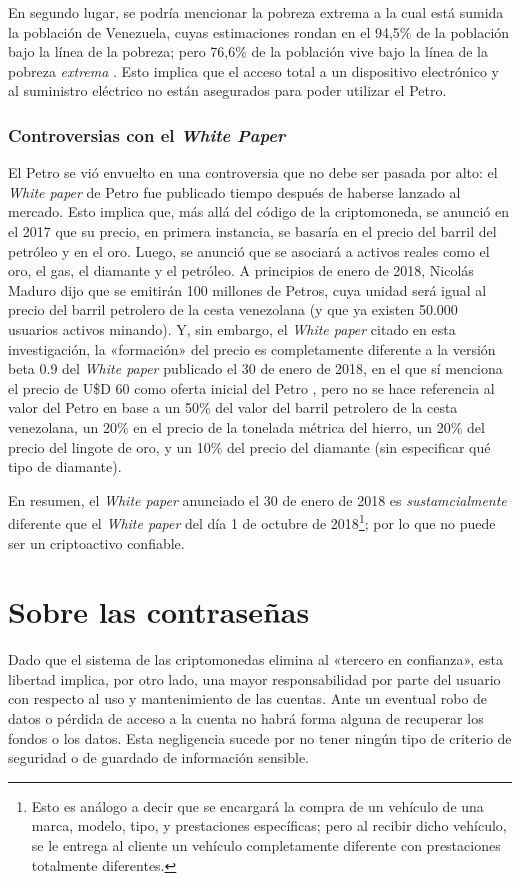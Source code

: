 \documentclass[12pt,a4paper,twoside]{book}
\begin{document}
En segundo lugar, se podría mencionar la pobreza extrema a la cual está sumida la población de Venezuela, cuyas estimaciones rondan en el 94,5\% de la población bajo la línea de la pobreza; pero 76,6\% de la población vive bajo la línea de la pobreza \textit{extrema} \cite[pág. 48]{encovi2021}. Esto implica que el acceso total a un dispositivo electrónico y al suministro eléctrico no están asegurados para poder utilizar el Petro.

\subsubsection{Controversias con el \textit{White Paper}}
El Petro se vió envuelto en una controversia que no debe ser pasada por alto: el \textit{White paper} de Petro fue publicado tiempo después de haberse lanzado al mercado. Esto implica que, más allá del código de la criptomoneda, se anunció en el 2017 que su precio, en primera instancia, se basaría en el precio del barril del petróleo y en el oro. Luego, se anunció que se asociará a activos reales como el oro, el gas, el diamante y el petróleo. A principios de enero de 2018, Nicolás Maduro dijo que se emitirán 100 millones de Petros, cuya unidad será igual al precio del barril petrolero de la cesta venezolana (y que ya existen 50.000 usuarios activos minando). Y, sin embargo, el \textit{White paper} citado en esta investigación, la «formación» del precio es completamente diferente a la versión beta 0.9 del \textit{White paper} publicado el 30 de enero de 2018, en el que sí menciona el precio de U\$D 60 como oferta inicial del Petro \cite[pág. 19]{petro:whitepaper-inicial}, pero no se hace referencia al valor del Petro en base a un 50\% del valor del barril petrolero de la cesta venezolana, un 20\% en el precio de la tonelada métrica del hierro, un 20\% del precio del lingote de oro, y un 10\% del precio del diamante (sin especificar qué tipo de diamante).

En resumen, el \textit{White paper} anunciado el 30 de enero de 2018 es \textit{sustamcialmente} diferente que el \textit{White paper} del día 1 de octubre de 2018\footnote{Esto es análogo a decir que se encargará la compra de un vehículo de una marca, modelo, tipo, y prestaciones específicas; pero al recibir dicho vehículo, se le entrega al cliente un vehículo completamente diferente con prestaciones totalmente diferentes.}; por lo que no puede ser un criptoactivo confiable.

\section{Sobre las contraseñas}
Dado que el sistema de las criptomonedas elimina al «tercero en confianza», esta libertad implica, por otro lado, una mayor responsabilidad por parte del usuario con respecto al uso y mantenimiento de las cuentas. Ante un eventual robo de datos o pérdida de acceso a la cuenta no habrá forma alguna de recuperar los fondos o los datos. Esta negligencia sucede por no tener ningún tipo de criterio de seguridad o de guardado de información sensible.
\end{document}
